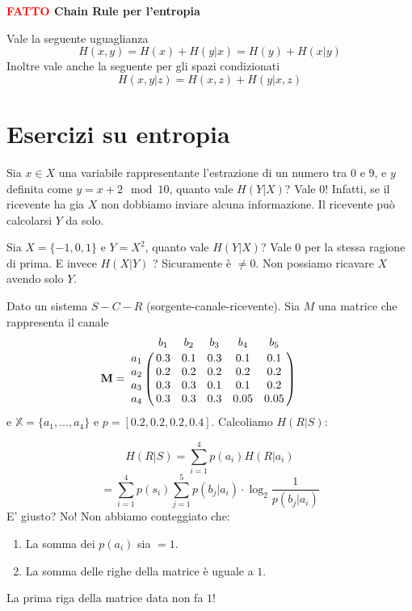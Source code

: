 \documentclass[12pt]{report}
\begin{document}
    \vspace{5px}
    \begin{tcolorbox}
        \textbf{\textcolor{red}{FATTO} Chain Rule per l'entropia}
        \vspace{5px}
        \begin{center}
            Vale la seguente uguaglianza
            $$H(x,y) = H(x) + H(y|x) = H(y) + H(x|y)$$
            Inoltre vale anche la seguente per gli spazi condizionati
            $$H(x,y|z) = H(x,z) + H(y|x,z)$$

        \end{center}
    \end{tcolorbox}

    \section{Esercizi su entropia}

    \begin{es}
        Sia $x \in X$ una variabile rappresentante l'estrazione di un numero tra $0$ e $9$, e $y$ definita come $y= x+2 \mod 10$, quanto vale $H(Y|X)$? Vale $0$! Infatti, se il ricevente ha gia $X$ non dobbiamo inviare alcuna informazione. Il ricevente può calcolarsi $Y$ da solo.
    \end{es}

    \begin{es}
        Sia $X = \{-1,0,1\}$ e $Y = X^2$, quanto vale $H(Y|X)$?  Vale $0$ per la stessa ragione di prima. E invece $H(X|Y)$ ? Sicuramente è $\neq 0 $. Non possiamo ricavare $X$ avendo solo $Y$.
    \end{es}

    \begin{es}
        Dato un sistema $S\!-\!C-\!R$ (sorgente-canale-ricevente). Sia $M$ una matrice che rappresenta il canale
        \[\mathbf{M} =
        \bordermatrix{ & b_1 & b_2 & b_3 & b_4 & b_5 \cr
        a_1 & 0.3 & 0.1 & 0.3 & 0.1 & 0.1 \cr
        a_2 & 0.2 & 0.2 & 0.2 & 0.2 & 0.2 \cr
        a_3 & 0.3 & 0.3 & 0.1 & 0.1 & 0.2  \cr
        a_4 & 0.3 & 0.3 & 0.3 & 0.05 & 0.05} \qquad
        \]
        e $\mathbb{X} = \{a_1,\dots,a_4\}$ e $p =[0.2, 0.2, 0.2, 0.4]$. Calcoliamo $H(R|S)$:

        $$H(R|S) = \sum_{i = 1}^4 p(a_i) H(R|a_i)$$
        $$= \sum_{i = 1}^4 p(s_i) \sum_{j = 1}^5 p(b_j|a_i) \cdot \log_2{\frac{1}{p(b_j|a_i)}}$$
        E' giusto? No! Non abbiamo conteggiato che:
        \begin{enumerate}
            \item La somma dei $p(a_i)$ sia $= 1$.
            \item La somma delle righe della matrice è uguale a $1$.
        \end{enumerate}
        La prima riga della matrice data non fa $1$!
    \end{es}
\end{document}
